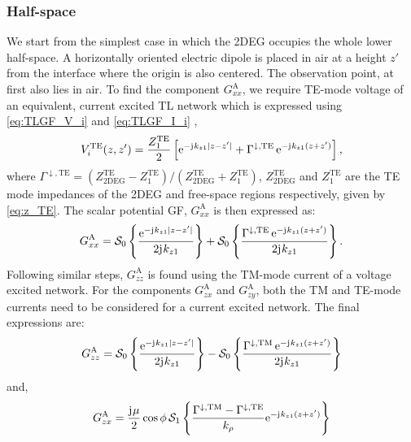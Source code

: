 \documentclass[12pt]{article}
\begin{document}
\subsubsection{Half-space}
%
We start from the simplest case in which the 2DEG occupies the whole lower half-space. A horizontally oriented electric dipole is placed in air at a height $z'$ from the interface where the origin is also centered. The observation point, at first also lies in air. To find the component $G_{xx}^\mathrm{A}$, we require TE-mode voltage of an equivalent, current excited TL network which is expressed using \eqref{eq:TLGF_V_i} and \eqref{eq:TLGF_I_i} \cite[Sec. 2.4]{Felsen1994} \cite{Michalski1997},
%
\begin{equation}
  V_i^{\mathrm{TE}}(z,z') = \frac{Z_1^{\mathrm{TE}}}{2} \left [ \mathrm{e}^{-\mathrm{j}\mkern1mu k_{z1} |z - z'|} + \Gamma^{\downarrow, \mathrm{TE}} \, \mathrm{e}^{-\mathrm{j}\mkern1mu k_{z1} (z + z')} \right],
  \label{eq:Vi_halfspace}
\end{equation}
%
where $\Gamma^{\downarrow, \mathrm{TE}} = (Z_{\mathrm{2DEG}}^{\mathrm{TE}} -  Z_1^{\mathrm{TE}})/(Z_{\mathrm{2DEG}}^{\mathrm{TE}} +  Z_1^{\mathrm{TE}})$,   $Z_{\mathrm{2DEG}}^{\mathrm{TE}}$ and $Z_1^{\mathrm{TE}}$ are the TE mode impedances of the 2DEG and free-space regions respectively, given by \eqref{eq:z_TE}. The scalar potential GF, $G_{xx}^\mathrm{A}$ is then expressed as:
%
\begin{equation}
  G_{xx}^\mathrm{A} = \mathcal{S}_0 \left \{ \frac{\mathrm{e}^{-\mathrm{j}\mkern1mu k_{z1} |z - z'|}}{2 \mathrm{j}\mkern1mu k_{z1}} \right \} + \mathcal{S}_0 \left \{ \frac{\Gamma^{\downarrow, \mathrm{TE}} \, \mathrm{e}^{-\mathrm{j}\mkern1mu k_{z1} (z + z')}}{2 \mathrm{j}\mkern1mu k_{z1}} \right \}.
  \label{eq:somm_Gxx}
\end{equation}
%
Following similar steps, $G_{zz}^\mathrm{A}$ is found using the TM-mode current of a voltage excited network. For the components $G_{zx}^\mathrm{A}$ and $G_{zy}^\mathrm{A}$, both the TM and TE-mode currents need to be considered for a current excited network. The final expressions are:
%
\begin{equation}
  G_{zz}^\mathrm{A} = \mathcal{S}_0 \left \{ \frac{\mathrm{e}^{-\mathrm{j}\mkern1mu k_{z1} |z - z'|}}{2 \mathrm{j}\mkern1mu k_{z1}} \right \} - \mathcal{S}_0 \left \{ \frac{\Gamma^{\downarrow, \mathrm{TM}} \, \mathrm{e}^{-\mathrm{j}\mkern1mu k_{z1} (z + z')}}{2 \mathrm{j}\mkern1mu k_{z1}} \right \}
  \label{eq:somm_Gzz}
\end{equation}
%
and,
%
\begin{equation}
  G_{zx}^\mathrm{A} = \frac{\mathrm{j}\mkern1mu \mu}{2} \cos \phi \, \mathcal{S}_1 \left \{ \frac{\Gamma^{\downarrow, \mathrm{TM}} - \Gamma^{\downarrow, \mathrm{TE}}}{ k_{\rho}} \mathrm{e}^{-\mathrm{j}\mkern1mu k_{z1} (z + z')} \right \}
  \label{eq:somm_Gzx}
\end{equation}
\clearpage %
% 


\end{document}
